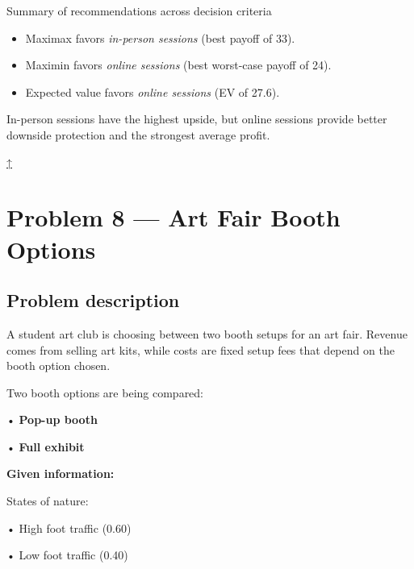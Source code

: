 \documentclass[11pt]{article}
\begin{document}
	Summary of recommendations across decision criteria
	\begin{itemize}
		\item Maximax favors \emph{in-person sessions} (best payoff of 33).
		\item Maximin favors \emph{online sessions} (best worst-case payoff of 24).
		\item Expected value favors \emph{online sessions} (EV of 27.6).
	\end{itemize}
	
	
	
	In-person sessions have the highest upside, but online sessions provide better downside protection and the strongest average profit.
	
	
	
	\hyperref[problem3b-criteria]{↑}
	\section*{Problem 8 — Art Fair Booth Options}
	
	\label{problem6}
	
	\subsection*{Problem description}
	
	\label{problem6-problem}
	
	A student art club is choosing between two booth setups for an art fair. Revenue comes from selling art kits, while costs are
	fixed setup fees that depend on the booth option chosen.
	
	
	
	
	
	
	Two booth options are being compared:
	
	
	
	• \textbf{Pop-up booth}
	
	
	
	• \textbf{Full exhibit}
	
	
	
	
	
	\textbf{Given information:}
	
	
	
	States of nature:
	
	
	
	• High foot traffic (0.60)
	
	
	
	• Low foot traffic (0.40)
	
	
	
\end{document}
